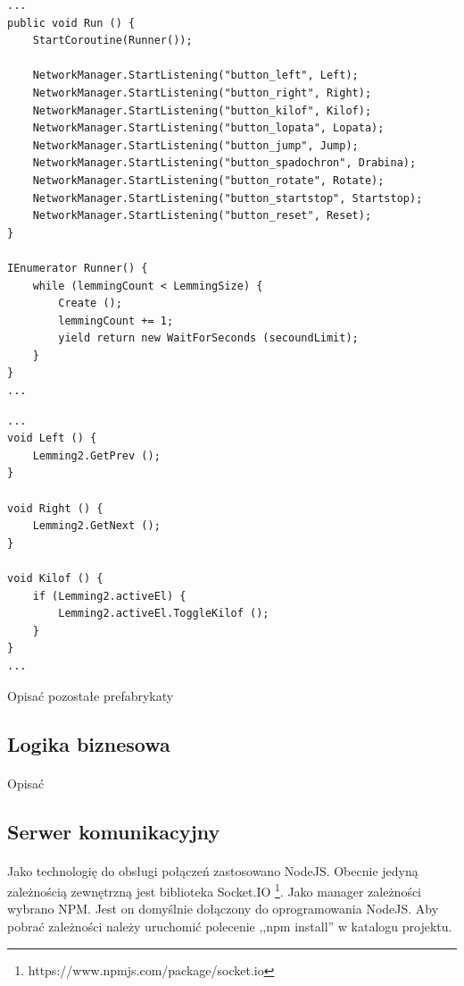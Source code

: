 \begin{lstlisting}[language=CSharp]
...
public void Run () {
	StartCoroutine(Runner());

	NetworkManager.StartListening("button_left", Left);
	NetworkManager.StartListening("button_right", Right);
	NetworkManager.StartListening("button_kilof", Kilof);
	NetworkManager.StartListening("button_lopata", Lopata);
	NetworkManager.StartListening("button_jump", Jump);
	NetworkManager.StartListening("button_spadochron", Drabina);
	NetworkManager.StartListening("button_rotate", Rotate);
	NetworkManager.StartListening("button_startstop", Startstop);
	NetworkManager.StartListening("button_reset", Reset);
}

IEnumerator Runner() {
	while (lemmingCount < LemmingSize) {
		Create ();
		lemmingCount += 1;
		yield return new WaitForSeconds (secoundLimit);
	}
}
...
\end{lstlisting}

\begin{lstlisting}[language=CSharp]
...
void Left () {
	Lemming2.GetPrev ();
}

void Right () {
	Lemming2.GetNext ();
}

void Kilof () {
	if (Lemming2.activeEl) {
		Lemming2.activeEl.ToggleKilof ();
	}
}
...
\end{lstlisting}


{\color{red}Opisać pozostałe prefabrykaty}

\subsection{Logika biznesowa}
\paragraph{}
{\color{red}Opisać}

\subsection{Serwer komunikacyjny}
\paragraph{}
Jako technologię do obsługi połączeń zastosowano NodeJS. Obecnie jedyną zależnością zewnętrzną jest biblioteka Socket.IO \footnote{https://www.npmjs.com/package/socket.io}.
Jako manager zależności wybrano NPM. Jest on domyślnie dołączony do oprogramowania NodeJS. Aby pobrać zależności należy uruchomić polecenie ,,npm install'' w katalogu projektu.

